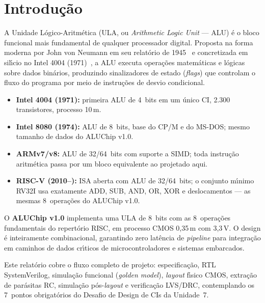 \documentclass[12pt,a4paper]{article}
\begin{document}
\newpage
\tableofcontents
\listoffigures
\listoftables
\newpage

\section{Introdu\c{c}\~{a}o}

A Unidade L\'{o}gico-Aritm\'{e}tica (ULA, ou \textit{Arithmetic Logic Unit} --- ALU) \'{e} o bloco funcional mais fundamental de qualquer processador digital. Proposta na forma moderna por John von Neumann em seu relat\'{o}rio de 1945~\cite{vonneumann1945} e concretizada em sil\'{\i}cio no Intel 4004 (1971)~\cite{intel4004}, a ALU executa opera\c{c}\~{o}es matem\'{a}ticas e l\'{o}gicas sobre dados bin\'{a}rios, produzindo sinalizadores de estado (\textit{flags}) que controlam o fluxo do programa por meio de instru\c{c}\~{o}es de desvio condicional.

\begin{unidadebox}
\begin{itemize}[leftmargin=1.5em]
  \item \textbf{Intel 4004 (1971):} primeira ALU de 4~bits em um \'{u}nico CI, 2.300 transistores, processo 10\,\textmu m.
  \item \textbf{Intel 8080 (1974):} ALU de 8~bits, base do CP/M e do MS-DOS; mesmo tamanho de dados do ALUChip v1.0.
  \item \textbf{ARMv7/v8:} ALU de 32/64~bits com suporte a SIMD; toda instru\c{c}\~{a}o aritm\'{e}tica passa por um bloco equivalente ao projetado aqui.
  \item \textbf{RISC-V (2010--):} ISA aberta com ALU de 32/64~bits; o conjunto m\'{\i}nimo RV32I usa exatamente ADD, SUB, AND, OR, XOR e deslocamentos --- as mesmas 8~opera\c{c}\~{o}es do ALUChip v1.0.
\end{itemize}
\end{unidadebox}

O \textbf{ALUChip v1.0} implementa uma ULA de 8~bits com as 8~opera\c{c}\~{o}es fundamentais do repert\'{o}rio RISC, em processo CMOS 0,35\,\textmu m com 3,3\,V. O design \'{e} inteiramente combinacional, garantindo zero lat\^{e}ncia de \textit{pipeline} para integra\c{c}\~{a}o em caminhos de dados cr\'{\i}ticos de microcontroladores e sistemas embarcados.

Este relat\'{o}rio cobre o fluxo completo de projeto: especifica\c{c}\~{a}o, RTL SystemVerilog, simula\c{c}\~{a}o funcional (\textit{golden model}), \textit{layout} f\'{\i}sico CMOS, extra\c{c}\~{a}o de par\'{a}sitas RC, simula\c{c}\~{a}o p\'{o}s-\textit{layout} e verifica\c{c}\~{a}o LVS/DRC, contemplando os 7~pontos obrigat\'{o}rios do Desafio de Design de CIs da Unidade~7.
\end{document}
